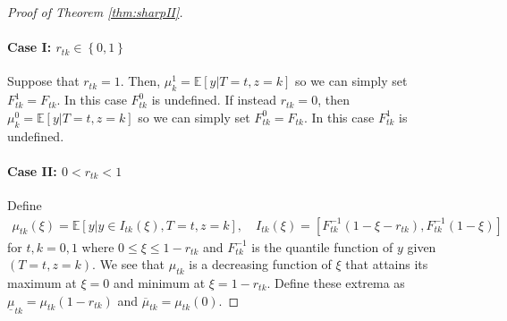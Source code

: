 \begin{proof}[Proof of Theorem \ref{thm:sharpII}]

\paragraph{Case I: $r_{tk}\in \left\{ 0,1 \right\}$}
Suppose that $r_{tk} = 1$.
Then, $\mu^1_k = \mathbb{E}[y|T=t,z=k]$ so we can simply set $F^1_{tk} = F_{tk}$.
In this case $F^0_{tk}$ is undefined.
If instead $r_{tk} = 0$, then $\mu^0_k = \mathbb{E}[y|T=t,z=k]$ so we can simply set $F^0_{tk} = F_{tk}$.
In this case $F^1_{tk}$ is undefined.

\paragraph{Case II: $0 < r_{tk} < 1$} 
Define
\begin{align*}
  \mu_{tk}(\xi) = \mathbb{E}[y|y\in I_{tk}(\xi), T=t, z=k], \quad
  I_{tk}(\xi) = \left[ F^{-1}_{tk}(1 - \xi - r_{tk}), F^{-1}_{tk}(1 - \xi) \right]
\end{align*}
for $t,k = 0,1$ where $0 \leq \xi \leq 1 - r_{tk}$ and $F^{-1}_{tk}$ is the quantile function of $y$ given $(T=t, z=k)$.
We see that $\mu_{tk}$ is a decreasing function of $\xi$ that attains its maximum at $\xi = 0$ and minimum at $\xi = 1 - r_{tk}$.
Define these extrema as $\underline{\mu}_{tk} = \mu_{tk}(1 - r_{tk})$ and $\overline{\mu}_{tk} = \mu_{tk}(0)$.


\end{proof}
